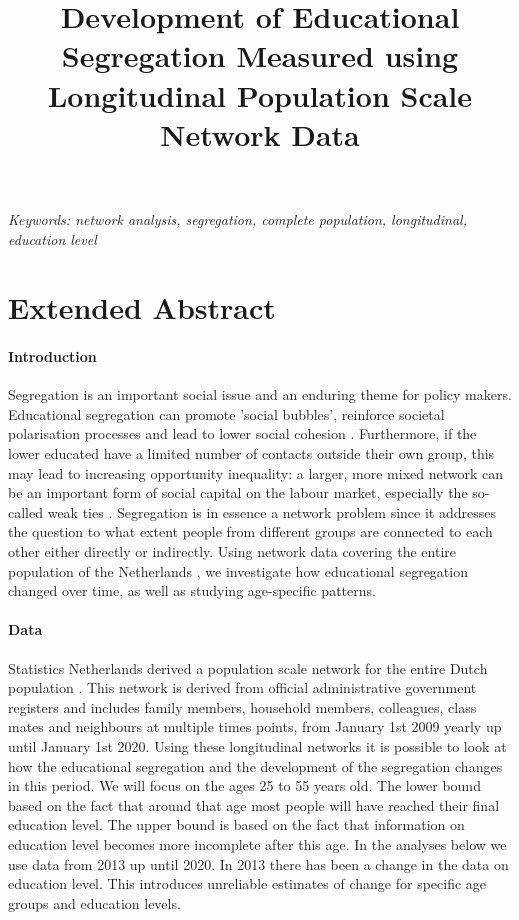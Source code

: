 \documentclass[a4paper,12pt]{article}
\title{Development of Educational Segregation Measured using Longitudinal Population Scale Network Data}
\date{}
\begin{document}
\maketitle
\thispagestyle{fancy}

\begin{center}
\textit{Keywords: network analysis, segregation, complete population, longitudinal, education level}
\newline
\end{center}

\section*{Extended Abstract}

\paragraph{Introduction}
 Segregation is an important social issue and an enduring theme for policy makers. Educational segregation can promote 'social bubbles', reinforce societal polarisation processes and lead to lower social cohesion \citep{Blossfeld2010,Iyengar2019}. Furthermore, if the lower educated have a limited number of contacts outside their own group, this may lead to increasing opportunity inequality: a larger, more mixed network can be an important form of social capital on the labour market, especially the so-called weak ties \citep{Granovetter1973}. Segregation is in essence a network problem since it addresses the question to what extent  people from different groups are connected to each other either directly or indirectly. Using network data covering the entire population of the Netherlands \citep{Laan2022}, we investigate how educational segregation changed over time, as well as studying age-specific patterns.

\paragraph{Data}
Statistics Netherlands derived a population scale network for the entire Dutch population \citep{Laan2022}. This network is derived from official administrative government registers \citep{Bakker2014} and includes family members, household members, colleagues, class mates and neighbours at multiple times points, from January 1st 2009 yearly up until January 1st 2020. Using these longitudinal networks it is possible to look at how the educational segregation and the development of the segregation changes in this period. We will focus on the ages 25 to 55 years old. The lower bound based on the fact that around that age most people will have reached their final education level. The upper bound is based on the fact that information on education level becomes more incomplete after this age. In the analyses below we use data from 2013 up until 2020. In 2013 there has been a change in the data on education level. This introduces unreliable estimates of change for specific age groups and education levels.
\end{document}

